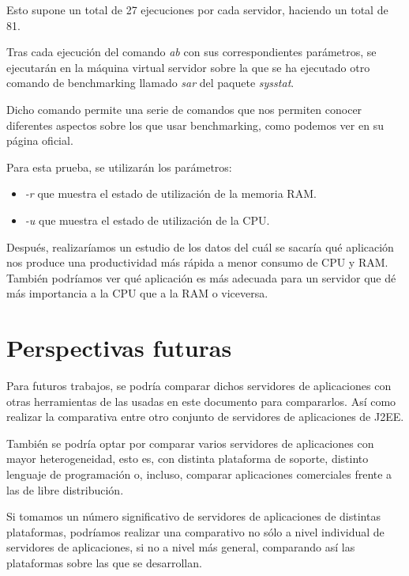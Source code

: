 \documentclass[a4paper, 10pt]{article}
\begin{document}
	Esto supone un total de 27 ejecuciones por cada servidor, haciendo un total de 81.
	
	Tras cada ejecución del comando \textit{ab} con sus correspondientes parámetros, se ejecutarán
	en la máquina virtual servidor sobre la que se ha ejecutado otro comando de benchmarking llamado
	\textit{sar} del paquete \textit{sysstat}.
	
	Dicho comando permite una serie de comandos que nos
	permiten conocer diferentes aspectos sobre los que usar benchmarking, como podemos ver en su página
	oficial\cite{SAR_official}.
	
	Para esta prueba, se utilizarán los parámetros:
	\begin{itemize}
		\item \textit{-r} que muestra el estado de utilización de la memoria RAM.
		\item \textit{-u} que muestra el estado de utilización de la CPU.
	\end{itemize}
	
	Después, realizaríamos un estudio de los datos del cuál se sacaría qué aplicación nos produce
	una productividad más rápida a menor consumo de CPU y RAM. También podríamos ver qué aplicación
	es más adecuada para un servidor que dé más importancia a la CPU que a la RAM o viceversa.

\section{Perspectivas futuras}
	Para futuros trabajos, se podría comparar dichos servidores de aplicaciones con otras herramientas
	de las usadas en este documento para compararlos. Así como realizar la comparativa entre otro
	conjunto de servidores de aplicaciones de J2EE.
	
	También se podría optar por comparar varios servidores de aplicaciones con mayor heterogeneidad,
	esto es, con distinta plataforma de soporte, distinto lenguaje de programación o, incluso,
	comparar aplicaciones comerciales frente a las de libre distribución.
	
	Si tomamos un número significativo de servidores de aplicaciones de distintas plataformas,
	podríamos realizar una comparativo no sólo a nivel individual de servidores de aplicaciones, si
	no a nivel más general, comparando así las plataformas sobre las que se desarrollan.
	
\end{document}
